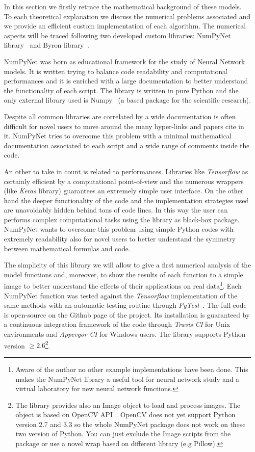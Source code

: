 \documentclass{standalone}
\begin{document}
In this section we firstly retrace the mathematical background of these models.
To each theoretical explanation we discuss the numerical problems associated and we provide an efficient custom implementation of each algorithm.
The numerical aspects will be traced following two developed custom libraries: NumPyNet library~\cite{NumPyNet} and Byron library~\cite{Byron}.

NumPyNet was born as educational framework for the study of Neural Network models.
It is written trying to balance code readability and computational performances and it is enriched with a large documentation to better understand the functionality of each script.
The library is written in pure Python and the only external library used is Numpy~\cite{Numpy} (a based package for the scientific research).

Despite all common libraries are correlated by a wide documentation is often difficult for novel users to move around the many hyper-links and papers cite in it.
NumPyNet tries to overcome this problem with a minimal mathematical documentation associated to each script and a wide range of comments inside the code.

An other  to take in count is related to performances.
Libraries like \emph{Tensorflow} as certainly efficient by a computational point-of-view and the numerous wrappers (like \emph{Keras} library) guarantees an extremely simple user interface.
On the other hand the deeper functionality of the code and the implementation strategies used are unavoidably hidden behind tons of code lines.
In this way the user can performs complex computational tasks using the library as black-box package.
NumPyNet wants to overcome this problem using simple Python codes with extremely readability also for novel users to better understand the symmetry between mathematical formulas and code.

The simplicity of this library we will allow to give a first numerical analysis of the model functions and, moreover, to show the results of each function to a simple image to better understand the effects of their applications on real data\footnote{
  Aware of the author no other example implementations have been done.
  This makes the NumPyNet library a useful tool for neural network study and a virtual laboratory for new neural network functions.
}.
Each NumPyNet function was tested against the \emph{Tensorflow} implementation of the same methods with an automatic testing routine through \emph{PyTest}~\cite{Okken:2017:PTP:3176124}.
The full code is open-source on the Github page of the project.
Its installation is guaranteed by a continuous integration framework of the code through \emph{Travis CI} for Unix environments and \emph{Appevyor CI} for Windows users.
The library supports Python version $\ge2.6$\footnote{
  The library provides also an \textsf{Image} object to load and process images.
  The object is based on OpenCV API~\cite{OpenCV}.
  OpenCV does not yet support Python version 2.7 and 3.3 so the whole NumPyNet package does not work on these two version of Python.
  You can just exclude the \textsf{Image} scripts from the package or use a novel wrap based on different library (e.g \textsf{Pillow}).
}.
\end{document}
